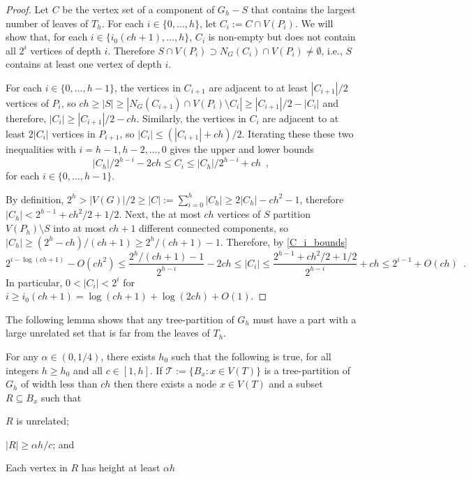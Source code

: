 \documentclass{patmorin}
\renewcommand{\le}{\leqslant}
\renewcommand{\ge}{\geqslant}
\begin{document}
\begin{proof}
  Let $C$ be the vertex set of a component of $G_h-S$ that contains the largest number of leaves of $T_h$.  For each $i\in\{0,\ldots,h\}$, let $C_i:=C\cap V(P_i)$. We will show that, for each $i\in\{i_0(ch+1),\ldots,h\}$, $C_i$ is non-empty but does not contain all $2^i$ vertices of depth $i$.  Therefore $S\cap V(P_i)\supset N_G(C_i)\cap V(P_i)\neq\emptyset$, i.e., $S$ contains at least one vertex of depth $i$.

  For each $i\in\{0,\ldots,h-1\}$, the vertices in $C_{i+1}$ are adjacent to at least $|C_{i+1}|/2$ vertices of $P_{i}$, so $ch \ge |S| \ge |N_G(C_{i+1})\cap V(P_i)\setminus C_{i}| \ge |C_{i+1}|/2 - |C_{i}|$ and therefore, $|C_{i}| \ge |C_{i+1}|/2 - ch$.  Similarly, the vertices in $C_i$ are adjacent to at least $2|C_i|$ vertices in $P_{i+1}$, so $|C_i|\le (|C_{i+1}| + ch)/2$.  Iterating these these two inequalities with $i=h-1,h-2,\ldots,0$ gives the upper and lower bounds
  \begin{equation}
    |C_h|/2^{h-i} - 2ch \le C_{i} \le |C_h|/2^{h-i} + ch   \enspace ,
    \label{C_i_bounds}
  \end{equation}
  for each $i\in\{0,\ldots,h-1\}$.

  By definition, $2^h >|V(G)|/2 \ge |C| := \sum_{i=0}^h |C_h| \ge 2|C_h|-ch^2-1$, therefore $|C_h| < 2^{h-1} + ch^2/2 + 1/2$.  Next, the at most $ch$ vertices of $S$ partition $V(P_h)\setminus S$ into at most $ch+1$ different connected components, so $|C_h| \ge (2^h-ch)/(ch+1) \ge 2^{h}/(ch+1) - 1$.  Therefore, by \cref{C_i_bounds}
  \[
      2^{i-\log(ch+1)} - O(ch^2) \le \frac{2^h/(ch+1)-1}{2^{h-i}} - 2ch \le |C_i|
      \le \frac{2^{h-1}+ch^2/2 + 1/2}{2^{h-i}} + ch \le 2^{i-1} + O(ch)
      \enspace .
  \]
  In particular, $0 < |C_i| < 2^i$ for $i\ge i_0(ch+1)= \log (ch+1) + \log(2ch)+O(1)$.
\end{proof}


The following lemma shows that any tree-partition of $G_h$ must have a part with a large unrelated set that is far from the leaves of $T_h$.

\begin{lem}\label{startup}
  For any $\alpha\in(0,1/4)$, there exists $h_0$ such that the following is true, for all integers $h\ge  h_0$ and all $c\in[1,h]$.  If $\mathcal{T}:=\{B_x:x\in V(T)\}$ is a tree-partition of $G_h$ of width less than $ch$ then there exists a node $x\in V(T)$ and a subset $R\subseteq B_x$ such that
  \begin{compactenum}[(i)]
    \item $R$ is unrelated;
    \item $|R|\ge \alpha h/c$; and
    \item Each vertex in $R$ has height at least $\alpha h$
  \end{compactenum}
\end{lem}
\end{document}
